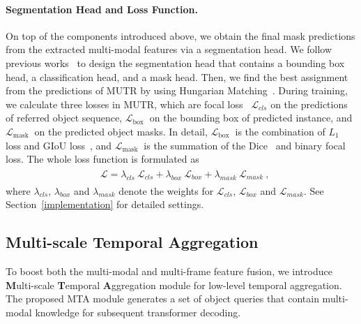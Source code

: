 \documentclass{article}
\begin{document}
\paragraph{Segmentation Head and Loss Function.}
On top of the components introduced above, we obtain the final mask predictions from the extracted multi-modal features via a segmentation head. We follow previous works~\cite{wu2022language,wu2021seqformer} to design the segmentation head that contains a bounding box head, a classification head, and a mask head. Then, we find the best assignment from the predictions of MUTR by using Hungarian Matching~\cite{carion2020end}. During training, we calculate three losses in MUTR, which are focal loss~\cite{lin2017focal} $\mathcal{L}_{c l s}$ on the predictions of referred object sequence, $\mathcal{L}_{\text {box }}$ on the bounding box of predicted instance, and $\mathcal{L}_{\text {mask }}$ on the predicted object masks. In detail, $\mathcal{L}_{\text {box }}$ is the combination of $L_1$ loss and GIoU loss~\cite{rezatofighi2019generalized}, and $\mathcal{L}_{\text {mask }}$ is the summation of the Dice~\cite{milletari2016v} and binary focal loss. The whole loss function is formulated as
\begin{align}
\label{loss}
\begin{split}
    & \mathcal{L} = \lambda_{cls}\ \mathcal{L}_{cls} + \lambda_{box}\ \mathcal{L}_{box} + \lambda_{mask}\ \mathcal{L}_{mask}\ ,
\end{split}
\end{align}
where $\lambda_{cls}$, $\lambda_{box}$ and $\lambda_{mask}$ denote the weights for $\mathcal{L}_{cls}$, $\mathcal{L}_{box}$ and $\mathcal{L}_{mask}$. See Section~\ref{implementation} for detailed settings.

\subsection{Multi-scale Temporal Aggregation}
\label{mta}
To boost both the multi-modal and multi-frame feature fusion, we introduce \textbf{M}ulti-scale \textbf{T}emporal \textbf{A}ggregation module for low-level temporal aggregation. The proposed MTA module generates a set of object queries that contain multi-modal knowledge for subsequent transformer decoding.
\end{document}
